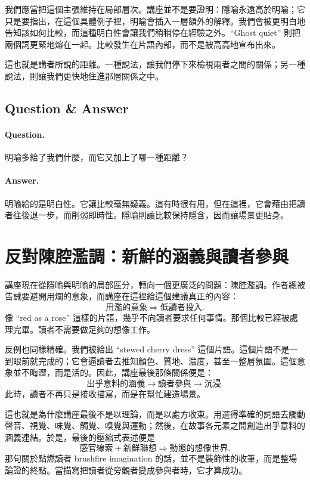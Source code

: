 我們應當把這個主張維持在局部層次。講座並不是要證明：隱喻永遠高於明喻；它只是要指出，在這個具體例子裡，明喻會插入一層額外的解釋。我們會被更明白地告知該如何比較，而這種明白性會讓我們稍稍停在經驗之外。``Ghost quiet'' 則把兩個詞更緊地熔在一起。比較發生在片語內部，而不是被高高地宣布出來。

這也就是講者所說的距離。一種說法，讓我們停下來檢視兩者之間的關係；另一種說法，則讓我們更快地住進那層關係之中。

\subsection{Question \& Answer}

\paragraph{Question.} 明喻多給了我們什麼，而它又加上了哪一種距離？

\paragraph{Answer.} 明喻給的是明白性。它讓比較毫無疑義。這有時很有用，但在這裡，它會藉由把讀者往後退一步，而削弱即時性。隱喻則讓比較保持隱含，因而讓場景更貼身。

\section{反對陳腔濫調：新鮮的涵義與讀者參與}

講座現在從隱喻與明喻的局部區分，轉向一個更廣泛的問題：陳腔濫調。作者總被告誡要避開用爛的意象，而講座在這裡給這個建議真正的內容：
\begin{equation}
\text{用濫的意象} \Rightarrow \text{低讀者投入}.
\end{equation}
像 ``red as a rose'' 這樣的片語，幾乎不向讀者要求任何事情。那個比較已經被處理完畢。讀者不需要做足夠的想像工作。

反例也同樣精確。我們被給出 ``stewed cherry dress'' 這個片語。這個片語不是一到眼前就完成的；它會逼讀者去推知顏色、質地、濃度，甚至一整層氛圍。這個意象並不晦澀，而是活的。因此，講座最後那條關係便是：
\begin{equation}
\text{出乎意料的涵義} \to \text{讀者參與} \to \text{沉浸}.
\end{equation}
此時，讀者不再只是接收描寫，而是在幫忙建造場景。

這也就是為什麼講座最後不是以理論，而是以處方收束。用選得準確的詞語去觸動聲音、視覺、味覺、觸覺、嗅覺與運動；然後，在故事各元素之間創造出乎意料的涵義連結。於是，最後的壓縮式表述便是
\begin{equation}
\text{感官線索} + \text{新鮮聯想} \Rightarrow \text{動態的想像世界}.
\end{equation}
那句關於點燃讀者 brushfire imagination 的話，並不是裝飾性的收筆，而是整場論證的終點。當描寫把讀者從旁觀者變成參與者時，它才算成功。

